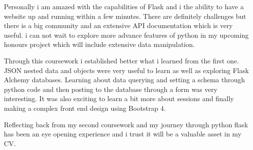 \documentclass[10pt, a4paper]{article}
\begin{document}
    Personally i am amazed with the capabilities of Flask and i the ability to have a website up and running within a few minutes. There are definitely challenges but there is a big community and an extensive API documentation which is very useful. i can not wait to explore more advance features of python in my upcoming honours project which will include extensive data manipulation. 
    
    Through this coursework i established better what i learned from the first one. JSON nested data and objects were very useful to learn as well as exploring Flask Alchemy databases. Learning about data querying and setting a schema through python code and then posting to the database through a form was very interesting. It was also exciting to learn a bit more about sessions and finally making a complex front end design using Bootstrap 4. 
    
    Reflecting back from my second coursework and my journey through python flask has been an eye opening experience and i trust it will be a valuable asset in my CV. 
\end{document}
